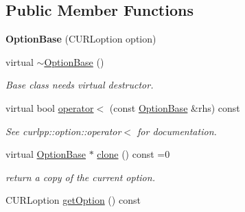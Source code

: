 \subsection*{Public Member Functions}
\begin{DoxyCompactItemize}
\item 
\hypertarget{classcurlpp_1_1OptionBase_adfd48c8371938134a028146d1980e82b}{{\bfseries Option\-Base} (C\-U\-R\-Loption option)}\label{classcurlpp_1_1OptionBase_adfd48c8371938134a028146d1980e82b}

\item 
\hypertarget{classcurlpp_1_1OptionBase_a9bad6d1c34bdc65bdee07014f88ffcc4}{virtual \hyperlink{classcurlpp_1_1OptionBase_a9bad6d1c34bdc65bdee07014f88ffcc4}{$\sim$\-Option\-Base} ()}\label{classcurlpp_1_1OptionBase_a9bad6d1c34bdc65bdee07014f88ffcc4}

\begin{DoxyCompactList}\small\item\em Base class needs virtual destructor. \end{DoxyCompactList}\item 
\hypertarget{classcurlpp_1_1OptionBase_aca2d80b6f3ab9fd59946c8f0580962ea}{virtual bool \hyperlink{classcurlpp_1_1OptionBase_aca2d80b6f3ab9fd59946c8f0580962ea}{operator$<$} (const \hyperlink{classcurlpp_1_1OptionBase}{Option\-Base} \&rhs) const }\label{classcurlpp_1_1OptionBase_aca2d80b6f3ab9fd59946c8f0580962ea}

\begin{DoxyCompactList}\small\item\em See curlpp\-::option\-::operator$<$ for documentation. \end{DoxyCompactList}\item 
\hypertarget{classcurlpp_1_1OptionBase_a55db7596ba57a679538c14adf5c680b4}{virtual \hyperlink{classcurlpp_1_1OptionBase}{Option\-Base} $\ast$ \hyperlink{classcurlpp_1_1OptionBase_a55db7596ba57a679538c14adf5c680b4}{clone} () const =0}\label{classcurlpp_1_1OptionBase_a55db7596ba57a679538c14adf5c680b4}

\begin{DoxyCompactList}\small\item\em return a copy of the current option. \end{DoxyCompactList}\item 
\hypertarget{classcurlpp_1_1OptionBase_ae3bb870443388b2143280d6432448ce9}{C\-U\-R\-Loption \hyperlink{classcurlpp_1_1OptionBase_ae3bb870443388b2143280d6432448ce9}{get\-Option} () const }\label{classcurlpp_1_1OptionBase_ae3bb870443388b2143280d6432448ce9}


\end{DoxyCompactItemize}
